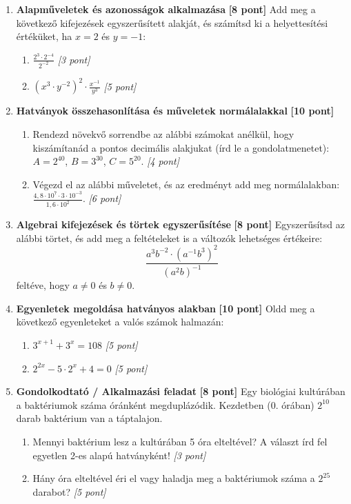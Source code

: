 \documentclass[a4paper,11pt]{article}
\begin{document}
\begin{enumerate}
  \item \textbf{Alapműveletek és azonosságok alkalmazása} \hfill \textbf{[8 pont]}
  Add meg a következő kifejezések egyszerűsített alakját, és számítsd ki a helyettesítési értéküket, ha $x = 2$ és $y = -1$:
  \begin{enumerate}
    \item $\frac{2^3 \cdot 2^{-4}}{2^{-2}}$ \hfill \textit{[3 pont]}
    \item $(x^3 \cdot y^{-2})^2 \cdot \frac{x^{-1}}{y^3}$ \hfill \textit{[5 pont]}
  \end{enumerate}

  \item \textbf{Hatványok összehasonlítása és műveletek normálalakkal} \hfill \textbf{[10 pont]}
  \begin{enumerate}
    \item Rendezd növekvő sorrendbe az alábbi számokat anélkül, hogy kiszámítanád a pontos decimális alakjukat (írd le a gondolatmenetet): 
    $A = 2^{40}$, $B = 3^{30}$, $C = 5^{20}$. \hfill \textit{[4 pont]}
    \item Végezd el az alábbi műveletet, és az eredményt add meg normálalakban: 
    $\frac{4,8 \cdot 10^7 \cdot 3 \cdot 10^{-3}}{1,6 \cdot 10^2}$. \hfill \textit{[6 pont]}
  \end{enumerate}

  \item \textbf{Algebrai kifejezések és törtek egyszerűsítése} \hfill \textbf{[8 pont]}
  Egyszerűsítsd az alábbi törtet, és add meg a feltételeket is a változók lehetséges értékeire:
  $$\frac{a^3 b^{-2} \cdot (a^{-1} b^3)^2}{(a^2 b)^{-1}}$$
  feltéve, hogy $a \neq 0$ és $b \neq 0$.

  \item \textbf{Egyenletek megoldása hatványos alakban} \hfill \textbf{[10 pont]}
  Oldd meg a következő egyenleteket a valós számok halmazán:
  \begin{enumerate}
    \item $3^{x+1} + 3^x = 108$ \hfill \textit{[5 pont]}
    \item $2^{2x} - 5 \cdot 2^x + 4 = 0$ \hfill \textit{[5 pont]}
  \end{enumerate}

  \item \textbf{Gondolkodtató / Alkalmazási feladat} \hfill \textbf{[8 pont]}
  Egy biológiai kultúrában a baktériumok száma óránként megduplázódik. Kezdetben (0. órában) $2^{10}$ darab baktérium van a táptalajon. 
  \begin{enumerate}
    \item Mennyi baktérium lesz a kultúrában 5 óra elteltével? A választ írd fel egyetlen 2-es alapú hatványként! \hfill \textit{[3 pont]}
    \item Hány óra elteltével éri el vagy haladja meg a baktériumok száma a $2^{25}$ darabot? \hfill \textit{[5 pont]}
  \end{enumerate}
\end{enumerate}
\end{document}
